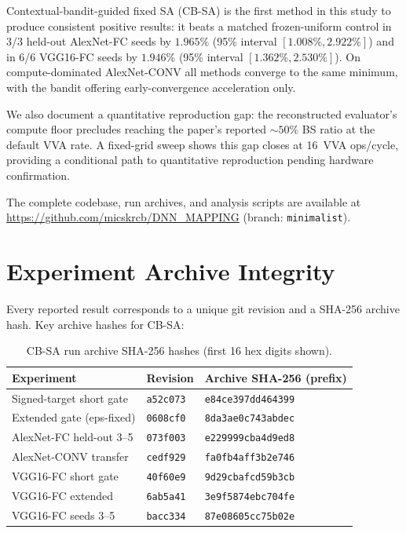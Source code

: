 \documentclass[10pt,conference]{IEEEtran}
\begin{document}
Contextual-bandit-guided fixed SA (CB-SA) is the first method in this study to
produce consistent positive results: it beats a matched frozen-uniform control
in 3/3 held-out AlexNet-FC seeds by $1.965\%$ (95\% interval $[1.008\%,
2.922\%]$) and in 6/6 VGG16-FC seeds by $1.946\%$ (95\% interval
$[1.362\%, 2.530\%]$).  On compute-dominated AlexNet-CONV all methods converge
to the same minimum, with the bandit offering early-convergence acceleration
only.

We also document a quantitative reproduction gap: the reconstructed evaluator's
compute floor precludes reaching the paper's reported ${\sim}50\%$ BS ratio at
the default VVA rate.  A fixed-grid sweep shows this gap closes at 16~VVA
ops/cycle, providing a conditional path to quantitative reproduction pending
hardware confirmation.

The complete codebase, run archives, and analysis scripts are available at
\url{https://github.com/micskrcb/DNN_MAPPING} (branch: \texttt{minimalist}).

\appendix

\section{Experiment Archive Integrity}
\label{app:integrity}

Every reported result corresponds to a unique git revision and a SHA-256
archive hash.  Key archive hashes for CB-SA:

\begin{table}[htbp]
  \caption{CB-SA run archive SHA-256 hashes (first 16 hex digits shown).}
  \label{tab:hashes}
  \centering
  \small
  \begin{tabular}{llp{4.5cm}}
    \toprule
    Experiment & Revision & Archive SHA-256 (prefix) \\
    \midrule
    Signed-target short gate  & \texttt{a52c073} & \texttt{e84ce397dd464399} \\
    Extended gate (eps-fixed)  & \texttt{0608cf0} & \texttt{8da3ae0c743abdec} \\
    AlexNet-FC held-out 3--5  & \texttt{073f003} & \texttt{e229999cba4d9ed8} \\
    AlexNet-CONV transfer     & \texttt{cedf929} & \texttt{fa0fb4aff3b2e746} \\
    VGG16-FC short gate       & \texttt{40f60e9} & \texttt{9d29cbafcd59b3cb} \\
    VGG16-FC extended         & \texttt{6ab5a41} & \texttt{3e9f5874ebc704fe} \\
    VGG16-FC seeds 3--5       & \texttt{bacc334} & \texttt{87e08605cc75b02e} \\
    \bottomrule
  \end{tabular}
\end{table}
\end{document}
